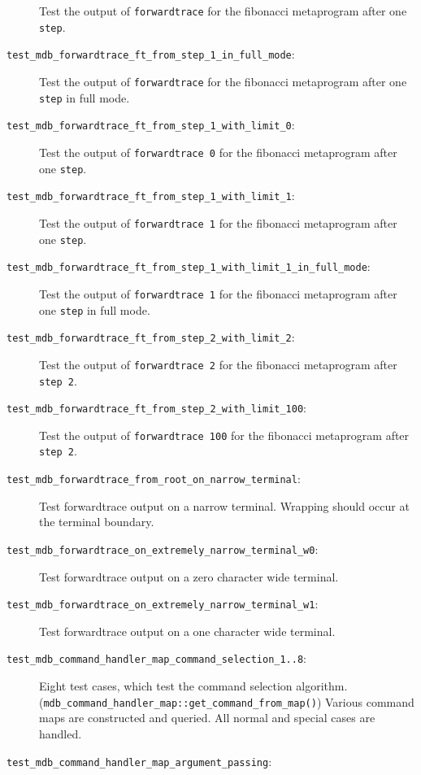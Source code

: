 \begin{description}
        Test the output of \texttt{forwardtrace} for the fibonacci metaprogram
        after one \texttt{step}.
    \item[\texttt{test\_mdb\_forwardtrace\_ft\_from\_step\_1\_in\_full\_mode}:]
        Test the output of \texttt{forwardtrace} for the fibonacci metaprogram
        after one \texttt{step} in full mode.
    \item[\texttt{test\_mdb\_forwardtrace\_ft\_from\_step\_1\_with\_limit\_0}:]
        Test the output of \texttt{forwardtrace 0} for the fibonacci
        metaprogram after one \texttt{step}.
    \item[\texttt{test\_mdb\_forwardtrace\_ft\_from\_step\_1\_with\_limit\_1}:]
        Test the output of \texttt{forwardtrace 1} for the fibonacci
        metaprogram after one \texttt{step}.
    \item[\texttt{test\_mdb\_forwardtrace\_ft\_from\_step\_1\_with\_limit\_1\_in\_full\_mode}:]
        Test the output of \texttt{forwardtrace 1} for the fibonacci
        metaprogram after one \texttt{step} in full mode.
    \item[\texttt{test\_mdb\_forwardtrace\_ft\_from\_step\_2\_with\_limit\_2}:]
        Test the output of \texttt{forwardtrace 2} for the fibonacci
        metaprogram after \texttt{step 2}.
    \item[\texttt{test\_mdb\_forwardtrace\_ft\_from\_step\_2\_with\_limit\_100}:]
        Test the output of \texttt{forwardtrace 100} for the fibonacci
        metaprogram after \texttt{step 2}.
    \item[\texttt{test\_mdb\_forwardtrace\_from\_root\_on\_narrow\_terminal}:]
        Test forwardtrace output on a narrow terminal. Wrapping should occur
        at the terminal boundary.
    \item[\texttt{test\_mdb\_forwardtrace\_on\_extremely\_narrow\_terminal\_w0}:]
        Test forwardtrace output on a zero character wide terminal.
    \item[\texttt{test\_mdb\_forwardtrace\_on\_extremely\_narrow\_terminal\_w1}:]
        Test forwardtrace output on a one character wide terminal.
    \item[\texttt{test\_mdb\_command\_handler\_map\_command\_selection\_1..8}:]
        Eight test cases, which test the command selection algorithm.
        (\texttt{mdb\_command\_handler\_map::get\_command\_from\_map()})
        Various command maps are constructed and queried. All normal and
        special cases are handled.
    \item[\texttt{test\_mdb\_command\_handler\_map\_argument\_passing}:]

\end{description}
